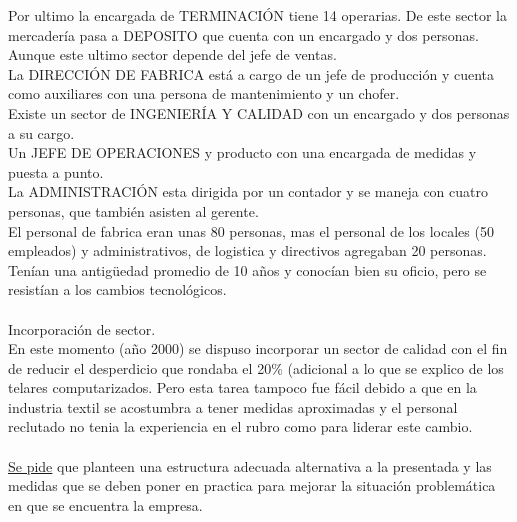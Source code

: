 \documentclass[a4paper,10pt,titlepage]{article}
\begin{document}
Por ultimo la encargada de TERMINACIÓN tiene 14 operarias. De este sector la
mercader\'ia pasa a DEPOSITO que cuenta con un encargado y dos personas.
Aunque este ultimo sector depende del jefe de ventas.\\
La DIRECCIÓN DE FABRICA est\'a a cargo de un jefe de producci\'on y cuenta
como auxiliares con una persona de mantenimiento y un chofer.\\
Existe un sector de INGENIERÍA Y CALIDAD con un encargado y dos personas a
su cargo.\\
Un JEFE DE OPERACIONES y producto con una encargada de medidas y puesta
a punto.\\
La ADMINISTRACIÓN esta dirigida por un contador y se maneja con cuatro
personas, que tambi\'en asisten al gerente.\\
El personal de fabrica eran unas 80 personas, mas el personal de los locales (50
empleados) y administrativos, de logistica y directivos agregaban 20 personas.
Ten\'ian una antigüedad promedio de 10 años y conoc\'ian bien su oficio, pero se
resist\'ian a los cambios tecnol\'ogicos.\\ \\
Incorporaci\'on de sector.\\
En este momento (año 2000) se dispuso incorporar un sector de calidad con el fin
de reducir el desperdicio que rondaba el 20\% (adicional a lo que se explico de los
telares computarizados. Pero esta tarea tampoco fue f\'acil debido a que en la
industria textil se acostumbra a tener medidas aproximadas y el personal reclutado
no tenia la experiencia en el rubro como para liderar este cambio.\\ \\
\underline{Se pide} que planteen una estructura adecuada alternativa a la presentada y las
medidas que se deben poner en practica para mejorar la situaci\'on problem\'atica en
que se encuentra la empresa.\\
\end{document}
